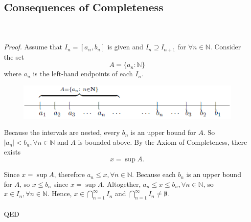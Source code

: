 \documentclass{article}
\begin{document}
    \subsection{Consequences of Completeness}
        \\ \\
        \textit{Proof.} Assume that $I_n = [a_n, b_n]$ is given and $I_n \supseteq I_{n+1}$ for $\forall n \in \mathbb{N}$. Consider the set
        \begin{equation*}
            A = \{a_n:\mathbb{N}\}
        \end{equation*}
        where $a_n$ is the left-hand endpoints of each $I_n$.
        \begin{figure}[ht!]
            \centering
            \includegraphics[width=0.8\linewidth]{figs/theorem1.4.1.png}
        \end{figure}
        Because the intervals are nested, every $b_n$ is an upper bound for $A$. So $|a_n| < b_n, \forall n \in \mathbb{N}$ and $A$ is bounded above. By the Axiom of Completeness, there exists
        \begin{equation*}
            x = \sup A.
        \end{equation*}
        
        Since $x = \sup A$, therefore $a_n \leq x, \forall n \in \mathbb{N}$. Because each $b_n$ is an upper bound for $A$, so $x \leq b_n$ since $x = \sup A$. Altogether, $a_n \leq x \leq b_n, \forall n \in \mathbb{N}$, so $x \in I_n, \forall n \in \mathbb{N}$. Hence, $x \in \bigcap_{n=1}^\infty I_n$ and $\bigcap_{n=1}^\infty I_n \neq \emptyset$.\\ \\
        QED
    
\end{document}

